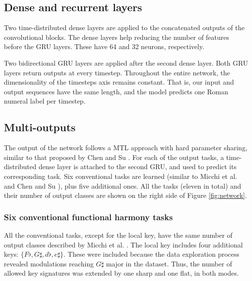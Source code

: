 \documentclass{article}
\begin{document}
\subsection{Dense and recurrent layers}

Two time-distributed dense layers are applied to the concatenated outputs of the convolutional blocks. The dense layers help reducing the number of features before the GRU layers. These have 64 and 32 neurons, respectively. 

Two bidirectional GRU \cite{cho_learning_2014} layers are applied after the second dense layer. 
Both GRU layers return outputs at every timestep. 
Throughout the entire network, the dimensionality of the timesteps axis remains constant. That is, our input and output sequences have the same length, and the model predicts one Roman numeral label per timestep. 

\subsection{Multi-outputs}

The output of the network follows a MTL approach with hard parameter sharing, similar to that proposed by Chen and Su \cite{chen_functional_2018}. For each of the output tasks, a time-distributed dense layer is attached to the second GRU, and used to predict its corresponding task. 
Six conventional tasks are learned (similar to Micchi et al. and Chen and Su \cite{micchi_not_2020, chen_attend_2021}), plus five additional ones. All the tasks (eleven in total) and their number of output classes are shown on the right side of Figure \ref{fig:network}.

\subsubsection{Six conventional functional harmony tasks}
All the conventional tasks, except for the local key, have the same number of output classes described by Micchi et al. \cite{micchi_not_2020}. The local key includes four additional keys: $\{F\flat, G\sharp, d\flat, e\sharp\}$. These were included because the data exploration process revealed modulations reaching $G\sharp$ major in the dataset.
Thus, the number of allowed key signatures was extended by one sharp and one flat, in both modes.
\end{document}
